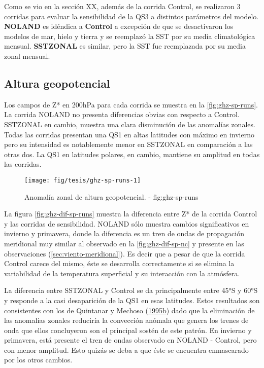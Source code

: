 \documentclass[spanish,a4paper,12p]{book}
\begin{document}
Como se vio en la sección XX, además de la corrida Control, se
realizaron 3 corridas para evaluar la sensibilidad de la QS3 a distintos
parámetros del modelo. \textbf{NOLAND} es idéndica a \textbf{Control} a
excepción de que se desactivaron los modelos de mar, hielo y tierra y se
reemplazó la SST por su media climatológica mensual. \textbf{SSTZONAL}
es similar, pero la SST fue reemplazada por su media zonal mensual.

\subsection{Altura geopotencial}\label{altura-geopotencial-2}

Los campos de Z* en 200hPa para cada corrida se muestra en la
\autoref{fig:ghz-sp-runs}. La corrida NOLAND no presenta diferencias
obvias con respecto a Control. SSTZONAL en cambio, muestra una clara
disminución de las anomalías zonales. Todas las corridas presentan una
QS1 en altas latitudes con máximo en invierno pero su intensidad es
notablemente menor en SSTZONAL en comparación a las otras dos. La QS1 en
latitudes polares, en cambio, mantiene su amplitud en todas las
corridas.

\begin{landscape}\begin{figure}

{\centering \texttt{[image: fig/tesis/ghz-sp-runs-1]} 

}

\caption{Anomalía zonal de altura geopotencial. - fig:ghz-sp-runs}\label{fig:ghz-sp-runs}
\end{figure}
\end{landscape}

La figura \autoref{fig:ghz-dif-sp-runs} muestra la diferencia entre Z*
de la corrida Control y las corridas de sensibilidad. NOLAND sólo
muestra cambios significativos en invierno y primavera, donde la
diferencia es un tren de ondas de propagación meridional muy similar al
observado en la \autoref{fig:ghz-dif-sp-nc} y presente en las
observaciones (\autoref{sec:viento-meridional}). Es decir que a pesar de
que la corrida Control carece del mismo, éste se desarrolla
correctamente si se elimina la variabilidad de la temperatura
superficial y su interacción con la atmósfera.

La diferencia entre SSTZONAL y Control se da principalmente entre 45°S y
60°S y responde a la casi desaparición de la QS1 en esas latitudes.
Estos resultados son consistentes con los de Quintanar y Mechoso
(\protect\hyperlink{ref-Quintanar1995}{1995}\protect\hyperlink{ref-Quintanar1995}{b})
dado que la eliminación de las anomalías zonales reduciría la convección
anómala que genera los trenes de onda que ellos concluyeron son el
principal sostén de este patrón. En invierno y primavera, está presente
el tren de ondas observado en NOLAND - Control, pero con menor amplitud.
Esto quizás se deba a que éste se encuentra enmascarado por los otros
cambios.
\end{document}

